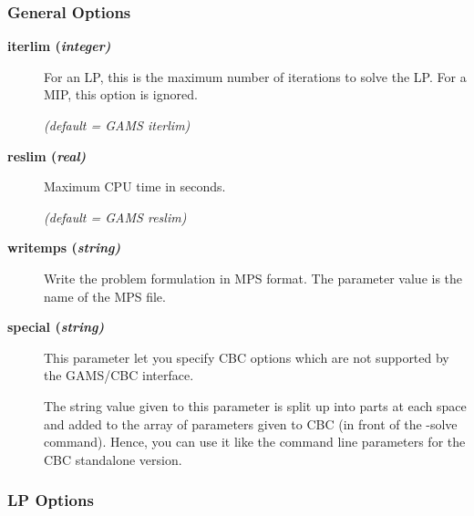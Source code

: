 \subsubsection{General Options}

\begin{description}

\item[\label{iterlim}\hypertarget{iterlim}
{\textbf{iterlim (\slshape{integer})}}]\hspace{1.0in}

For an LP, this is the maximum number of iterations to solve the LP.
For a MIP, this option is ignored.

\textsl{(default = GAMS iterlim)}

\item[\label{reslim}\hypertarget{reslim}
{\textbf{reslim (\slshape{real})}}]\hspace{1.0in}

Maximum CPU time in seconds.

\textsl{(default = GAMS reslim)}

\item[\label{writemps}\hypertarget{writemps}
{\textbf{writemps (\slshape{string})}}]\hspace{1.0in}

Write the problem formulation in MPS format.
The parameter value is the name of the MPS file.

\item[\label{special}\hypertarget{special}
{\textbf{special (\slshape{string})}}]\hspace{1.0in}

This parameter let you specify CBC options which are not supported by the GAMS/CBC interface.

The string value given to this parameter is split up into parts at each space and added to the array of parameters given to CBC (in front of the -solve command).
Hence, you can use it like the command line parameters for the CBC standalone version.

\end{description}

\subsubsection{LP Options}

